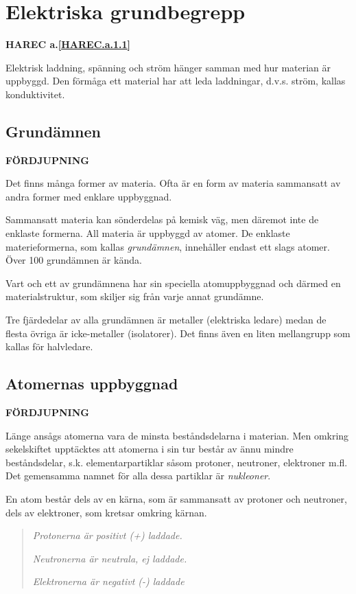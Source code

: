 
\section{Elektriska grundbegrepp}
\textbf{HAREC a.\ref{HAREC.a.1.1}\label{myHAREC.a.1.1}}

Elektrisk laddning, spänning och ström hänger samman med hur materian är
uppbyggd. Den förmåga ett material har att leda laddningar, d.v.s. ström,
kallas konduktivitet.

\subsection{Grundämnen}
\textbf{FÖRDJUPNING}

Det finns många former av materia. Ofta är en form av materia sammansatt av
andra former med enklare uppbyggnad.

Sammansatt materia kan sönderdelas på kemisk väg, men däremot inte de enklaste
formerna. All materia är uppbyggd av atomer. De enklaste materieformerna, som
kallas \emph{grundämnen}, innehåller endast ett slags atomer. Över 100
grundämnen är kända.

Vart och ett av grundämnena har sin speciella atomuppbyggnad och därmed en
materialstruktur, som skiljer sig från varje annat grundämne.

Tre fjärdedelar av alla grundämnen är metaller (elektriska ledare) medan de
flesta övriga är icke-metaller (isolatorer). Det finns även en liten
mellangrupp som kallas för halvledare.

\subsection{Atomernas uppbyggnad}
\textbf{FÖRDJUPNING}

Länge ansågs atomerna vara de minsta beståndsdelarna i materian. Men omkring
sekelskiftet upptäcktes att atomerna i sin tur består av ännu mindre
beståndsdelar, s.k. elementarpartiklar såsom protoner, neutroner, elektroner
m.fl. Det gemensamma namnet för alla dessa partiklar är \emph{nukleoner}.

En atom består dels av en kärna, som är sammansatt av protoner och neutroner,
dels av elektroner, som kretsar omkring kärnan.

\begin{quote}
\emph{Protonerna är positivt (+) laddade.}

\emph{Neutronerna är neutrala, ej laddade.}

\emph{Elektronerna är negativt (-) laddade}
\end{quote}

